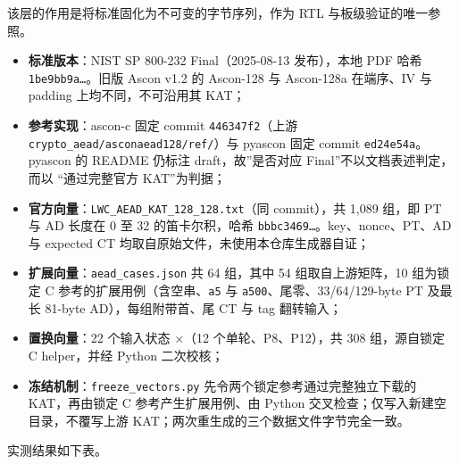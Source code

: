 该层的作用是将标准固化为不可变的字节序列，作为 RTL 与板级验证的唯一参照。

\begin{itemize}
\tightlist
\item
  \textbf{标准版本}：NIST SP 800-232 Final（2025-08-13 发布），本地 PDF 哈希 \texttt{1be9bb9a…}。旧版 Ascon v1.2 的 Ascon-128 与 Ascon-128a 在端序、IV 与 padding 上均不同，不可沿用其 KAT；
\item
  \textbf{参考实现}：ascon-c 固定 commit \texttt{446347f2}（上游 \texttt{crypto\_\allowbreak{}aead/\allowbreak{}asconaead128/\allowbreak{}ref/\allowbreak{}}）与 pyascon 固定 commit \texttt{ed24e54a}。pyascon 的 README 仍标注 draft，故''是否对应 Final''不以文档表述判定，而以 ``通过完整官方 KAT''为判据；
\item
  \textbf{官方向量}：\texttt{LWC\_\allowbreak{}AEAD\_\allowbreak{}KAT\_\allowbreak{}128\_\allowbreak{}128.\allowbreak{}txt}（同 commit），共 1,089 组，即 PT 与 AD 长度在 0 至 32 的笛卡尔积，哈希 \texttt{bbbc3469…}。key、nonce、PT、AD 与 expected CT 均取自原始文件，未使用本仓库生成器自证；
\item
  \textbf{扩展向量}：\texttt{aead\_\allowbreak{}cases.\allowbreak{}json} 共 64 组，其中 54 组取自上游矩阵，10 组为锁定 C 参考的扩展用例（含空串、\texttt{a5} 与 \texttt{a500}、尾零、33/64/129-byte PT 及最长 81-byte AD），每组附带首、尾 CT 与 tag 翻转输入；
\item
  \textbf{置换向量}：22 个输入状态 $\times$（12 个单轮、P8、P12），共 308 组，源自锁定 C helper，并经 Python 二次校核；
\item
  \textbf{冻结机制}：\texttt{freeze\_\allowbreak{}vectors.\allowbreak{}py} 先令两个锁定参考通过完整独立下载的 KAT，再由锁定 C 参考产生扩展用例、由 Python 交叉检查；仅写入新建空目录，不覆写上游 KAT；两次重生成的三个数据文件字节完全一致。
\end{itemize}

实测结果如下表。

